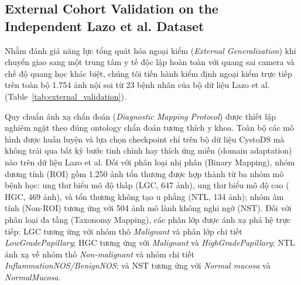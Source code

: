 \documentclass[runningheads]{llncs}
\begin{document}
\subsection{External Cohort Validation on the Independent Lazo et al. Dataset}
\label{sec:external_validation}
Nhằm đánh giá năng lực tổng quát hóa ngoại kiểm (\textit{External Generalization}) khi chuyển giao sang một trung tâm y tế độc lập hoàn toàn với quang sai camera và chế độ quang học khác biệt, chúng tôi tiến hành kiểm định ngoại kiểm trực tiếp trên toàn bộ 1.754 ảnh nội soi từ 23 bệnh nhân của bộ dữ liệu Lazo et al. \cite{ref_lazo2023semisupervised} (Table~\ref{tab:external_validation}).

Quy chuẩn ánh xạ chẩn đoán (\textit{Diagnostic Mapping Protocol}) được thiết lập nghiêm ngặt theo đúng ontology chẩn đoán tương thích y khoa. Toàn bộ các mô hình được huấn luyện và lựa chọn checkpoint chỉ trên bộ dữ liệu CystoDS mà không trải qua bất kỳ bước tinh chỉnh hay thích ứng miền (domain adaptation) nào trên dữ liệu Lazo et al. Đối với phân loại nhị phân (Binary Mapping), nhóm dương tính ($\text{ROI}$) gồm 1.250 ảnh tổn thương được hợp thành từ ba nhóm mô bệnh học: ung thư biểu mô độ thấp ($\text{LGC}$, 647 ảnh), ung thư biểu mô độ cao ($\text{HGC}$, 469 ảnh), và tổn thương không tạo u phẳng ($\text{NTL}$, 134 ảnh); nhóm âm tính ($\text{Non-ROI}$) tương ứng với 504 ảnh mô lành không nghi ngờ ($\text{NST}$). Đối với phân loại đa tầng (Taxonomy Mapping), các phân lớp được ánh xạ phả hệ trực tiếp: $\text{LGC}$ tương ứng với nhóm thô \textit{Malignant} và phân lớp chi tiết \textit{LowGradePapillary}; $\text{HGC}$ tương ứng với \textit{Malignant} và \textit{HighGradePapillary}; $\text{NTL}$ ánh xạ về nhóm thô \textit{Non-malignant} và nhóm chi tiết \textit{InflammationNOS/BenignNOS}; và $\text{NST}$ tương ứng với \textit{Normal mucosa} và \textit{NormalMucosa}.
\end{document}
